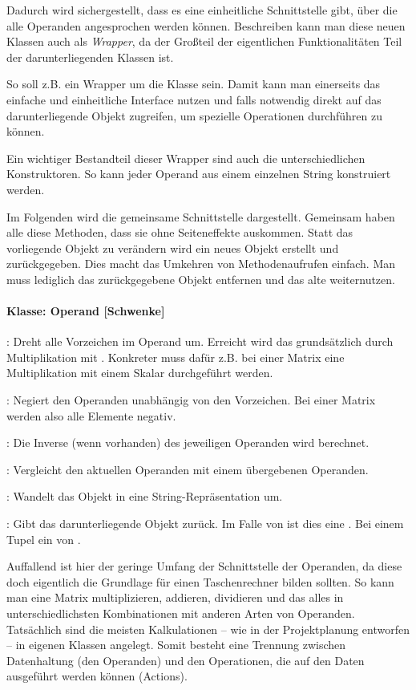 Dadurch wird sichergestellt, dass es eine einheitliche Schnittstelle gibt, über die alle Operanden angesprochen werden können. Beschreiben kann man diese neuen Klassen auch als \textit{Wrapper}, da der Großteil der eigentlichen Funktionalitäten Teil der darunterliegenden Klassen ist. 

So soll z.B.  ein Wrapper um die Klasse  sein. Damit kann man einerseits das einfache und einheitliche Interface nutzen und falls notwendig direkt auf das darunterliegende Objekt zugreifen, um spezielle Operationen durchführen zu können. 

Ein wichtiger Bestandteil dieser Wrapper sind auch die unterschiedlichen Konstruktoren. So kann jeder Operand aus einem einzelnen String konstruiert werden. 

Im Folgenden wird die gemeinsame Schnittstelle dargestellt. Gemeinsam haben alle diese Methoden, dass sie ohne Seiteneffekte auskommen. Statt das vorliegende Objekt zu verändern wird ein neues Objekt erstellt und zurückgegeben. Dies macht das Umkehren von Methodenaufrufen einfach. Man muss lediglich das zurückgegebene Objekt entfernen und das alte weiternutzen.

\paragraph{Klasse: Operand [Schwenke]}

: Dreht alle Vorzeichen im Operand um. Erreicht wird das grundsätzlich durch Multiplikation mit . Konkreter muss dafür z.B. bei einer Matrix eine Multiplikation mit einem Skalar durchgeführt werden.

: Negiert den Operanden unabhängig von den Vorzeichen. Bei einer Matrix werden also alle Elemente negativ.

: Die Inverse (wenn vorhanden) des jeweiligen Operanden wird berechnet.

: Vergleicht den aktuellen Operanden mit einem übergebenen Operanden.

: Wandelt das Objekt in eine String-Repräsentation um.

: Gibt das darunterliegende Objekt zurück. Im Falle von  ist dies eine . Bei einem Tupel ein  von .

Auffallend ist hier der geringe Umfang der Schnittstelle der Operanden, da diese doch eigentlich die Grundlage für einen Taschenrechner bilden sollten. So kann man eine Matrix multiplizieren, addieren, dividieren und das alles in unterschiedlichsten Kombinationen mit anderen Arten von Operanden. Tatsächlich sind die meisten Kalkulationen – wie in der Projektplanung entworfen – in eigenen Klassen angelegt. Somit besteht eine Trennung zwischen Datenhaltung (den Operanden) und den Operationen, die auf den Daten ausgeführt werden können (Actions).

